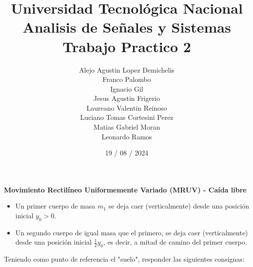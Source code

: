 \documentclass[12pt,a4paper]{report}
\title{%
  \fontsize{25}{0}\selectfont Universidad Tecnológica Nacional \\
  \fontsize{22}{30}\selectfont Analisis de Señales y Sistemas \\
  \fontsize{20}{25}\selectfont Trabajo Practico 2
}
\author{
Alejo Agustin Lopez Demichelis\\
Franco Palombo\\
Ignacio Gil\\
Jesus Agustin Frigerio\\
Laureano Valentin Reinoso\\
Luciano Tomas Cortesini Perez\\
Matias Gabriel Moran\\
Leonardo Ramos\\
}
\date{19 / 08 / 2024}
\begin{document}
\maketitle

\chapter{}%

\textbf{Movimiento Rectilíneo Uniformemente Variado (MRUV) - Caída libre}

\begin{itemize}
  \item Un primer cuerpo de masa $m_1$ se deja caer (verticalmente) desde una posición inicial $y_0 > 0$.

  \item Un segundo cuerpo de igual masa que el primero, se deja caer (verticalmente) desde una posición inicial 
     $\frac{1}{2} y_0$, es decir, a mitad de camino del primer cuerpo.

\end{itemize}

Teniendo como punto de referencia el "suelo", responder las siguientes consignas:
\end{document}
